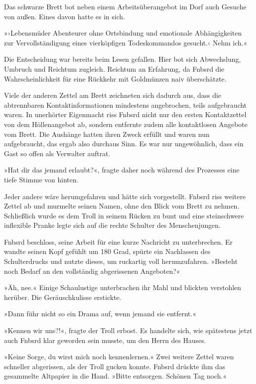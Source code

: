 Das schwarze Brett bot neben einem Arbeitsüberangebot im Dorf auch Gesuche von außen. Eines davon hatte es in sich.

»›Lebensmüder Abenteurer ohne Ortsbindung und emotionale Abhängigkeiten zur Vervollständigung eines vierköpfigen Todeskommandos gesucht.‹ Nehm ich.«

Die Entscheidung war bereits beim Lesen gefallen. Hier bot sich Abwechslung, Umbruch und Reichtum zugleich. Reichtum an Erfahrung, da Fnbsrd die Wahrscheinlichkeit für eine Rückkehr mit Goldmünzen naiv überschätzte.

Viele der anderen Zettel am Brett zeichneten sich dadurch aus, dass die abtrennbaren Kontaktinformationen mindestens angebrochen, teils aufgebraucht waren. In unerhörter Eigenmacht riss Fnbsrd nicht nur den ersten Kontaktzettel von dem Höllenangebot ab, sondern entfernte zudem alle kontaktlosen Angebote vom Brett. Die Aushänge hatten ihren Zweck erfüllt und waren nun aufgebraucht, das ergab also durchaus Sinn. Es war nur ungewöhnlich, dass ein Gast so offen als Verwalter auftrat.

»Hat dir das jemand erlaubt?«, fragte daher noch während des Prozesses eine tiefe Stimme von hinten.

Jeder andere wäre herumgefahren und hätte sich vorgestellt. Fnbsrd riss weitere Zettel ab und murmelte seinen Namen, ohne den Blick vom Brett zu nehmen. Schließlich wurde es dem Troll in seinem Rücken zu bunt und eine steinschwere inflexible Pranke legte sich auf die rechte Schulter des Menschenjungen.

Fnbsrd beschloss, seine Arbeit für eine kurze Nachricht zu unterbrechen. Er wandte seinen Kopf gefühlt um 180 Grad, spürte ein Nachlassen des Schulterdrucks und nutzte dieses, um ruckartig voll herumzufahren. »Besteht noch Bedarf an den vollständig abgerissenen Angeboten?«

»Äh, nee.« Einige Schaulustige unterbrachen ihr Mahl und blickten verstohlen herüber. Die Geräuschkulisse erstickte.

»Dann führ nicht so ein Drama auf, wenn jemand sie entfernt.«

»Kennen wir uns?!«, fragte der Troll erbost. Es handelte sich, wie spätestens jetzt auch Fnbsrd klar geworden sein musste, um den Herrn des Hauses.

»Keine Sorge, du wirst mich noch kennenlernen.« Zwei weitere Zettel waren schneller abgerissen, als der Troll gucken konnte. Fnbsrd drückte ihm das gesammelte Altpapier in die Hand. »Bitte entsorgen. Schönen Tag noch.«

